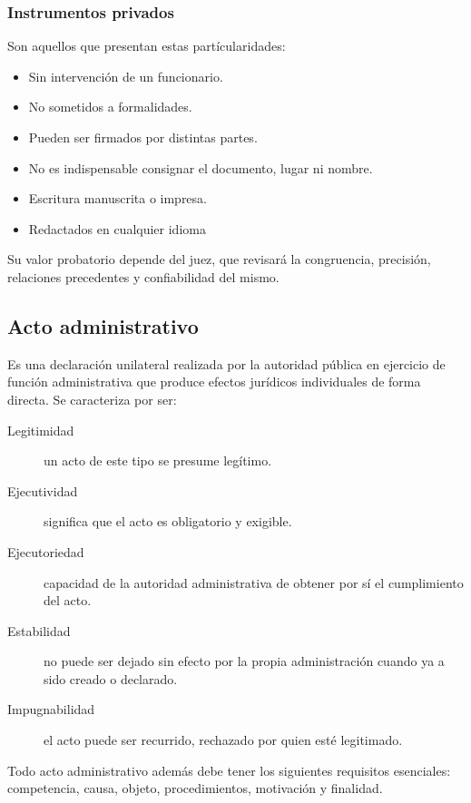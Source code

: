 \documentclass[../main.tex]{subfiles}
\begin{document}
\subsubsection{Instrumentos privados}

Son aquellos que presentan estas partícularidades:
\begin{itemize}
  \item Sin intervención de un funcionario.
  \item No sometidos a formalidades.
  \item Pueden ser firmados por distintas partes.
  \item No es indispensable consignar el documento, lugar ni nombre.
  \item Escritura manuscrita o impresa.
  \item Redactados en cualquier idioma
\end{itemize}

Su valor probatorio depende del juez, que revisará la congruencia, precisión,
relaciones precedentes y confiabilidad del mismo.

\subsection{Acto administrativo}

Es una declaración unilateral realizada por la autoridad pública en ejercicio
de función administrativa que produce efectos jurídicos individuales de 
forma directa. Se caracteriza por ser:

\begin{description}
  \item[Legitimidad] un acto de este tipo se presume legítimo.
  \item[Ejecutividad] significa que el acto es obligatorio y exigible.
  \item[Ejecutoriedad] capacidad de la autoridad administrativa de obtener por sí
    el cumplimiento del acto.
  \item[Estabilidad] no puede ser dejado sin efecto por la propia administración
    cuando ya a sido creado o declarado.
  \item[Impugnabilidad] el acto puede ser recurrido, rechazado por quien esté 
    legitimado.
\end{description}

Todo acto administrativo además debe tener los siguientes requisitos esenciales:
competencia, causa, objeto, procedimientos, motivación y finalidad.
\end{document}
